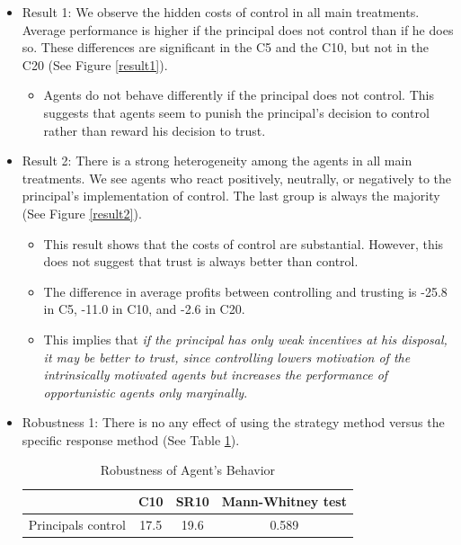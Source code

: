 \documentclass[../root]{subfiles}
\begin{document}
    \begin{itemize}
        \item Result 1: We observe the hidden costs of control in all main treatments. Average performance is higher if the principal does not control than if he does so. These differences are significant in the C5 and the C10, but not in the C20 (See Figure \ref{result1}).
        \begin{itemize}
            \item Agents do not behave differently if the principal does not control. This suggests that agents seem to punish the principal's decision to control rather than reward his decision to trust.
        \end{itemize}
        \item Result 2: There is a strong heterogeneity among the agents in all main treatments. We see agents who react positively, neutrally, or negatively to the principal's implementation of control. The last group is always the majority (See Figure \ref{result2}).
        \begin{itemize}
            \item This result shows that the costs of control are substantial. However, this does not suggest that trust is always better than control.
            \item The difference in average profits between controlling and trusting is -25.8 in C5, -11.0 in C10, and -2.6 in C20.
            \item This implies that \textit{if the principal has only weak incentives at his disposal, it may be better to trust, since controlling lowers motivation of the intrinsically motivated agents but increases the performance of opportunistic agents only marginally}.
        \end{itemize}
        \item Robustness 1: There is no any effect of using the strategy method versus the specific response method (See Table \ref{robust1}).
        \begin{table}[h]
            \centering
            \caption{Robustness of Agent's Behavior}
            \label{robust1}
            \begin{tabular}{lccc}
                \hline
                &
                C10 &
                SR10 &
                Mann-Whitney test\\
                \hline 
                Principals control &
                17.5 &
                19.6 &
                0.589 \\

\end{tabular}
\end{table}
\end{itemize}
\end{document}
